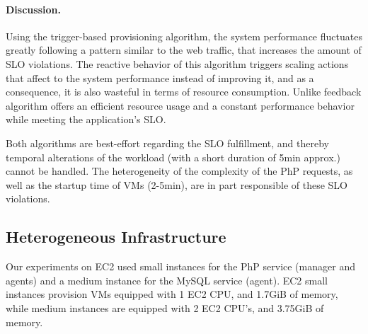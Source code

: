 \paragraph{Discussion.}

Using the trigger-based provisioning algorithm, the system performance fluctuates greatly following a pattern similar to the web traffic, that increases the amount of SLO violations. The reactive behavior of this algorithm triggers scaling actions that affect to the system performance instead of improving it, and as a consequence, it is also wasteful in terms of resource consumption. Unlike feedback algorithm offers an efficient resource usage and a constant performance behavior while meeting the application's SLO. 



Both algorithms are best-effort regarding the SLO fulfillment, and thereby temporal alterations of the workload (with a short duration of 5min approx.) cannot be handled. The heterogeneity of the complexity of the PhP requests, as well as the startup time of VMs (2-5min), are in part responsible of these SLO violations.




\subsection*{Heterogeneous Infrastructure}

Our experiments on EC2 used small instances for the PhP service (manager and agents) and  a medium instance for the MySQL service (agent). EC2 small instances provision VMs equipped with 1 EC2 CPU, and 1.7GiB of memory, while medium instances are equipped with 2 EC2 CPU's, and 3.75GiB of memory.

